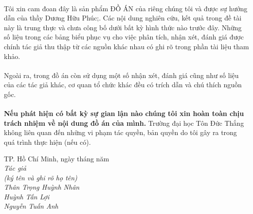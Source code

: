 \documentclass{report}
\newcommand\tab[1][1.25cm]{\hspace*{#1}}
\begin{document}
\paragraph{}
Tôi xin cam đoan đây là sản phẩm ĐỒ ÁN của riêng  chúng tôi và được sự hướng dẫn của thầy Dương Hữu Phúc;. Các nội dung nghiên cứu, kết quả trong đề tài này là trung thực và chưa công bố dưới bất kỳ hình thức nào trước đây. Những số liệu trong các bảng biểu phục vụ cho việc phân tích, nhận xét, đánh giá được chính tác giả thu thập từ các nguồn khác nhau có ghi rõ trong phần tài liệu tham khảo.
\paragraph{}
Ngoài ra, trong đồ án còn sử dụng một số nhận xét, đánh giá cũng như số liệu của các tác giả khác, cơ quan tổ chức khác đều có trích dẫn và chú thích nguồn gốc.
\paragraph{}
\textbf{Nếu phát hiện có bất kỳ sự gian lận nào chúng tôi xin hoàn toàn chịu trách nhiệm về nội dung đồ án của mình.} Trường đại học Tôn Đức Thắng không liên quan đến những vi phạm tác quyền, bản quyền do tôi gây ra trong quá trình thực hiện (nếu có).
\begin{flushright}
	TP. Hồ Chí Minh, ngày \tab[1cm] tháng \tab[1cm] năm \tab[1cm]\tab \\
	
	\textit{Tác giả \tab\tab\tab\tab\\
		(ký tên và ghi rõ họ tên)\tab[2cm] \\
		\vspace{1.5cm}
		Thân Trọng Huỳnh Nhân\tab\quad\tab\\
		\vspace{1.5cm}
		Huỳnh Tấn Lợi\tab\quad \tab\quad\\
		\vspace{1.5cm}
		Nguyễn Tuấn Anh\tab\tab\tab\\}

\end{flushright}
\pagebreak

\end{document}
